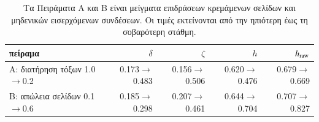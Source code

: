 \begin{table}[t]
\centering
\small
\caption{Τα Πειράματα Α και Β είναι μείγματα επιδράσεων κρεμάμενων σελίδων και μηδενικών εισερχόμενων συνδέσεων. Οι τιμές εκτείνονται από την ηπιότερη έως τη σοβαρότερη στάθμη.}
\label{tab:mixture}
\begin{tabular}{@{}lrrrr@{}}\toprule
πείραμα & $\delta$ & $\zeta$ & $h$ & $h_{\rm raw}$ \\
\midrule
Α: διατήρηση τόξων 1.0$\to$0.2 & 0.173$\to$0.483 & 0.156$\to$0.506 & 0.620$\to$0.476 & 0.679$\to$0.669 \\
Β: απώλεια σελίδων 0.1$\to$0.6 & 0.185$\to$0.298 & 0.207$\to$0.461 & 0.644$\to$0.704 & 0.707$\to$0.827 \\
\bottomrule\end{tabular}
\end{table}
